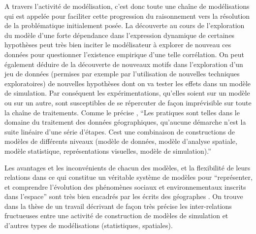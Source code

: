 A travers l'activité de modélisation, c'est donc toute une chaîne de modélisations qui est appelée pour faciliter cette progression du raisonnement vers la résolution de la problématique initialement posée. La découverte au cours de l'exploration du modèle d'une forte dépendance dans l'expression dynamique de certaines hypothèses peut très bien inciter le modélisateur à explorer de nouveau ces données pour questionner l'existence empirique d'une telle corrélation. On peut également déduire de la découverte de nouveaux motifs dans l'exploration d'un jeu de données (permises par exemple par l'utilisation de nouvelles techniques exploratoires) de nouvelles hypothèses dont on va tester les effets dans un modèle de simulation. Par conséquent les expérimentations, qu'elles soient sur un modèle ou sur un autre, sont susceptibles de se répercuter de façon imprévisible sur toute la chaîne de traitements. Comme le précise \textcite[63]{Mathian2014}, \enquote{Les pratiques sont telles dans le domaine du traitement des données géographiques, qu'aucune démarche n'est la suite linéaire d'une série d'étapes. Cest une combinaison de constructions de modèles de différents niveaux (modèle de données, modèle d'analyse spatiale, modèle statistique, représentations visuelles, modèle de simulation).}

Les avantages et les inconvénients de chacun des modèles, et la flexibilité de leurs relations dans ce qui constitue un véritable système de modèles pour \enquote{représenter, et comprendre l'évolution des phénomènes sociaux et environnementaux inscrits dans l'espace} sont très bien encadrés par les écrits des géographes \textcites{Sanders2000, Mathian2014}. On trouve dans la thèse de \textcite{Cottineau2014a, Cottineau2014b} un travail décrivant de façon très précise les inter-relations fructueuses entre une activité de construction de modèles de simulation et d'autres types de modélisations (statistiques, spatiales). 



